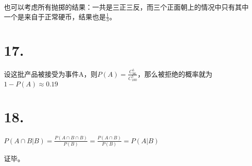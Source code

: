 \documentclass[UTF8]{report}
\begin{document}
        也可以考虑所有抛掷的结果：一共是三正三反，而三个正面朝上的情况中只有其中一个是来自于正常硬币，结果也是$\frac{1}{3}$。
    \section*{17.}
        设这批产品被接受为事件A，则$P(A) = \frac{C_{96}^{5}}{C_{100}^5}$，那么被拒绝的概率就为$1 - P(A) \approx 0.19$
    \section*{18.}
        $P(A \cap B|B) = \frac{P(A \cap B \cap B)}{P(B)} = \frac{P(A \cap B)}{P(B)} = P(A|B)$

        证毕。
\end{document}
